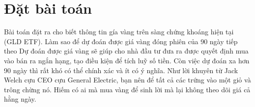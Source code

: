 \section{Đặt bài toán}
\label{sec:model:problem}
Bài toán đặt ra cho biết thông tin gía vàng trên sàng chứng khoáng hiện tại (GLD ETF). Làm sao để dự đoán 
được giá vàng đóng phiên của 90 ngày tiếp theo
Dự đoán được giá vàng sẽ giúp cho nhà đầu tư đưa ra được quyết định mua vào bán ra ngắn hạng, tạo điều kiện để
tích luỹ số tiền. Còn việc dự đoán xa hơn 90 ngày thì rất khó có thể chính xác và ít có ý nghĩa. Như lời khuyên từ Jack Welch cựu CEO cựu
General Electric, bạn nên để tất cả các trứng vào một giỏ và trông chừng nó. Hiếm có ai mà mua vàng để sinh lời mà lại không theo dõi giá cả hằng ngày.


